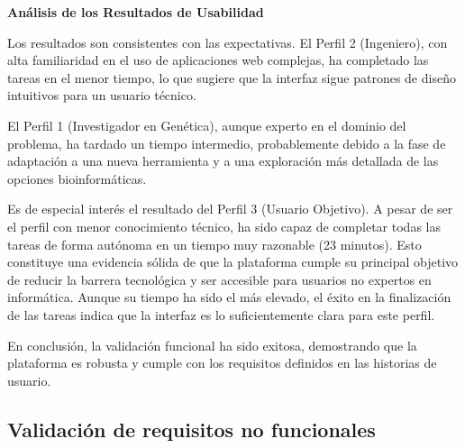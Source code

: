 \textbf{Análisis de los Resultados de Usabilidad}

Los resultados son consistentes con las expectativas. El Perfil 2 (Ingeniero), con alta familiaridad en el uso de aplicaciones web complejas, ha completado las tareas en el menor tiempo, lo que sugiere que la interfaz sigue patrones de diseño intuitivos para un usuario técnico.

El Perfil 1 (Investigador en Genética), aunque experto en el dominio del problema, ha tardado un tiempo intermedio, probablemente debido a la fase de adaptación a una nueva herramienta y a una exploración más detallada de las opciones bioinformáticas.

Es de especial interés el resultado del Perfil 3 (Usuario Objetivo). A pesar de ser el perfil con menor conocimiento técnico, ha sido capaz de completar todas las tareas de forma autónoma en un tiempo muy razonable (23 minutos). Esto constituye una evidencia sólida de que la plataforma cumple su principal objetivo de reducir la barrera tecnológica y ser accesible para usuarios no expertos en informática. Aunque su tiempo ha sido el más elevado, el éxito en la finalización de las tareas indica que la interfaz es lo suficientemente clara para este perfil.

En conclusión, la validación funcional ha sido exitosa, demostrando que la plataforma es robusta y cumple con los requisitos definidos en las historias de usuario.

\subsection{Validación de requisitos no funcionales}

